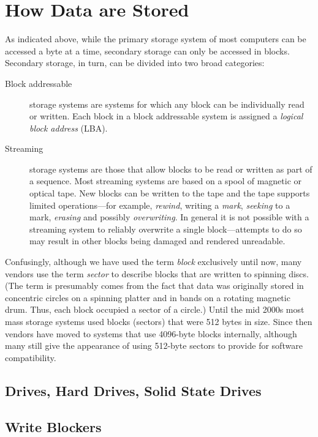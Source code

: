 \chapter{How Data are Stored}
As indicated above, while the primary storage system of most computers can be accessed a
byte at a time, secondary storage can only be accessed in
blocks. Secondary storage, in turn, can be divided into two broad
categories:

\begin{description}
\item[Block addressable] storage systems are systems for which any
  block can be individually read or written. Each block in a block
  addressable system is assigned a \emph{logical block address}
  (LBA). 
\item[Streaming] storage systems are those that allow blocks to be
  read or written as part of a sequence. Most streaming systems are
  based on a spool of magnetic or optical tape. New blocks can be
  written to the tape and the tape supports limited operations---for
  example, \emph{rewind}, writing a \emph{mark}, \emph{seeking} to a mark,
   \emph{erasing} and possibly \emph{overwriting}. In general it is
   not possible with a streaming system to reliably overwrite a single
   block---attempts to do so may result in other blocks being damaged
   and rendered unreadable.
\end{description}

Confusingly, although we have used the term \emph{block} exclusively
until now, many vendors use the term \emph{sector} to describe blocks
that are written to spinning discs. (The term is presumably comes from
the fact that data was originally stored in concentric circles on a spinning platter
and in bands on a rotating magnetic drum. Thus, each block occupied a
sector of a circle.) Until the mid 2000s most mass storage systems
used blocks (sectors) that were 512 bytes in size. Since then vendors
have moved to systems that use 4096-byte blocks internally, although
many still give the appearance of using 512-byte sectors to provide
for software compatibility. 

\section{Drives, Hard Drives, Solid State Drives}

\section{Write Blockers}

